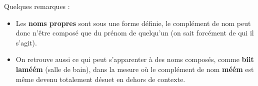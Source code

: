 Quelques remarques : 
\begin{itemize}
    \item Les \textbf{noms propres} sont sous une forme définie, le complément de nom peut donc n'être composé que du prénom de quelqu'un (on sait forcément de qui il s'agit).
    \item On retrouve aussi ce qui peut s'apparenter à des noms composés, comme \textbf{biit la\textcrh méém} (salle de bain), dans la mesure où le complément de nom \textbf{\textcrh méém} est même devenu totalement désuet en dehors de contexte.
\end{itemize}

